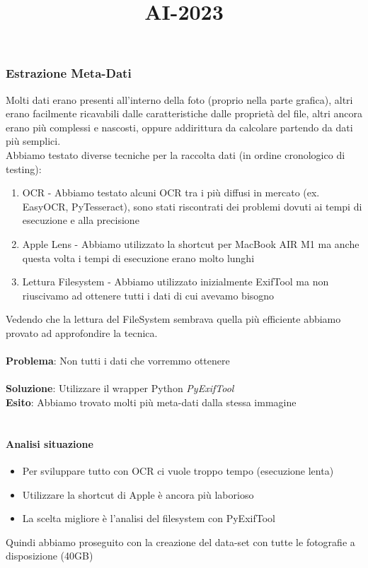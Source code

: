 \title{AI-2023}\documentclass[12pt,a4paper,twoside]{article}
\begin{document}
\subsubsection{Estrazione Meta-Dati}
Molti dati erano presenti all'interno della foto (proprio nella parte grafica), altri erano facilmente ricavabili 
dalle caratteristiche dalle proprietà del file, altri ancora erano più complessi e nascosti, oppure addirittura 
da calcolare partendo da dati più semplici.\\
Abbiamo testato diverse tecniche per la raccolta dati (in ordine cronologico di testing):
\begin{enumerate}
    \item OCR - Abbiamo testato alcuni OCR tra i più diffusi in mercato (ex. EasyOCR, PyTesseract), sono stati 
          riscontrati dei problemi dovuti ai tempi di esecuzione e alla precisione
    \item Apple Lens - Abbiamo utilizzato la shortcut per MacBook AIR M1 ma anche questa volta i tempi di 
          esecuzione erano molto lunghi
    \item Lettura Filesystem - Abbiamo utilizzato inizialmente ExifTool ma non riuscivamo ad ottenere tutti i 
          dati di cui avevamo bisogno
\end{enumerate}
Vedendo che la lettura del FileSystem sembrava quella più efficiente abbiamo provato ad approfondire la tecnica.
\\\\
\textbf{Problema}: Non tutti i dati che vorremmo ottenere\\
\\
\textbf{Soluzione}: Utilizzare il wrapper Python \textit{PyExifTool}\\
\textbf{Esito}: Abbiamo trovato molti più meta-dati dalla stessa immagine\\
\\

\paragraph{Analisi situazione}
\begin{itemize}
    \item Per sviluppare tutto con OCR ci vuole troppo tempo (esecuzione lenta)
    \item Utilizzare la shortcut di Apple è ancora più laborioso
    \item La scelta migliore è l'analisi del filesystem con PyExifTool
\end{itemize}
Quindi abbiamo proseguito con la creazione del data-set con tutte le fotografie a disposizione (40GB)
\end{document}
